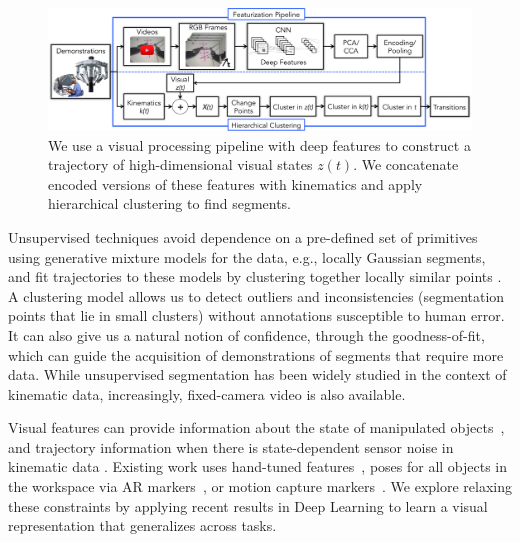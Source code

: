 \documentclass[0-main.tex]{subfiles}
\begin{document}
\begin{figure}
    \centering
    \vspace{-10pt}
    \includegraphics[width=1.55\linewidth]{figures/sysArch}
    \caption{We use a visual processing pipeline with deep features to construct a trajectory of high-dimensional visual states $z(t)$.
    We concatenate encoded versions of these features with kinematics and apply hierarchical clustering to find segments.}%
    \label{fig:pipeline}
    \vspace{-10pt}
\end{figure}


Unsupervised techniques avoid dependence on a pre-defined set of primitives using generative mixture models for the data, e.g., locally Gaussian segments, and fit trajectories to these models by clustering together locally similar points \cite{calinon2010learning, krishnan2015tsc, kruger2010learning} .
A clustering model allows us to detect outliers and inconsistencies (segmentation points that lie in small clusters) without annotations susceptible to human error.
It can also give us a natural notion of confidence, through the goodness-of-fit, which can guide the acquisition of demonstrations of segments that require more data. 
While unsupervised segmentation has been widely studied in the context of kinematic data, increasingly, fixed-camera video is also available.

Visual features can provide information about the state of manipulated objects~\cite{krishnan2015tsc, Niekum2015learning}, and trajectory information when there is state-dependent sensor noise in kinematic data \cite{mahler2014learning}.
Existing work uses hand-tuned features~\cite{krishnan2015tsc}, poses for all objects in the workspace via AR markers~\cite{Niekum2015learning}, or motion capture markers~\cite{kulic2011incremental}.
We explore relaxing these constraints by applying recent results in Deep Learning to learn a visual representation that generalizes across tasks.
\end{document}
